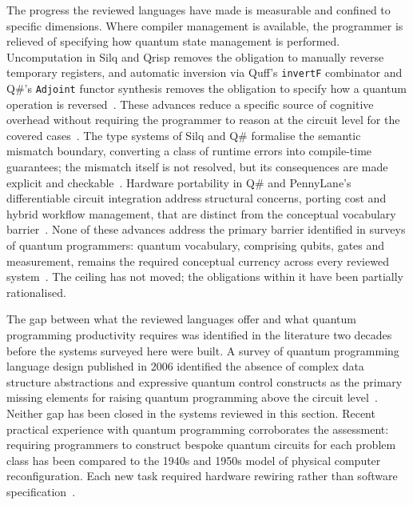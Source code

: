 The progress the reviewed languages have made is measurable and confined to specific dimensions.
Where compiler management is available, the programmer is relieved of specifying how quantum state management is performed.
Uncomputation in Silq and Qrisp removes the obligation to manually reverse temporary registers, and automatic inversion via Quff's \texttt{invertF} combinator and Q\#'s \texttt{Adjoint} functor synthesis removes the obligation to specify how a quantum operation is reversed~\cite{bichsel2020silq, seidel2024qrisp,wright2024quff, MicrosoftQSharpOverview}.
These advances reduce a specific source of cognitive overhead without requiring the programmer to reason at the circuit level for the covered cases~\cite{corralesgarro2025productivityexpressiveness}.
The type systems of Silq and Q\# formalise the semantic mismatch boundary, converting a class of runtime errors into compile-time guarantees; the mismatch itself is not resolved, but its consequences are made explicit and checkable~\cite{bichsel2020silq, MicrosoftQSharpOverview}.
Hardware portability in Q\# and PennyLane's differentiable circuit integration address structural concerns, porting cost and hybrid workflow management, that are distinct from the conceptual vocabulary barrier~\cite{MicrosoftQSharpOverview,bergholm2018pennylane}.
None of these advances address the primary barrier identified in surveys of quantum programmers: quantum vocabulary, comprising qubits, gates and measurement, remains the required conceptual currency across every reviewed system~\cite{ferreira2024qplusage}.
The ceiling has not moved; the obligations within it have been partially rationalised.

The gap between what the reviewed languages offer and what quantum programming productivity requires was identified in the literature two decades before the systems surveyed here were built.
A survey of quantum programming language design published in 2006 identified the absence of complex data structure abstractions and expressive quantum control constructs as the primary missing elements for raising quantum programming above the circuit level~\cite{Gay2006QPLSurvey}.
Neither gap has been closed in the systems reviewed in this section.
Recent practical experience with quantum programming corroborates the assessment: requiring programmers to construct bespoke quantum circuits for each problem class has been compared to the 1940s and 1950s model of physical computer reconfiguration.
Each new task required hardware rewiring rather than software specification~\cite{cobb2022higherlevelabstractions}.

